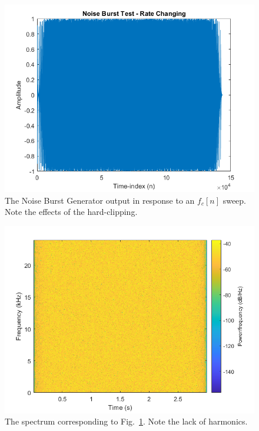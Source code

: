 \documentclass[../main.tex]{subfiles}
\begin{document}
\begin{figure}[ht]
    \centering
    \includegraphics[scale=.65]{./images/plots/NBGTest2.png}
    \caption{The Noise Burst Generator output in response to an $f_c[n]$ sweep. Note the effects of the hard-clipping.}
    \label{fig:NBGT2}
\end{figure}

\begin{figure}[hb]
    \centering
    \includegraphics[scale=.65]{./images/plots/NBGTest2Spectrum.png}
    \caption{The spectrum corresponding to Fig.~\ref{fig:NBGT2}. Note the lack of harmonics.}
    \label{fig:NBGT2Spec}
\end{figure}

\clearpage
\end{document}
